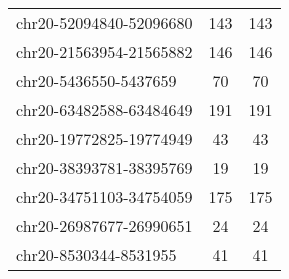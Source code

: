 \begin{longtable}{lSS}
	chr20-52094840-52096680 & 143    & 143                                       \\
	chr20-21563954-21565882 & 146    & 146                                       \\
	chr20-5436550-5437659   & 70     & 70                                        \\
	chr20-63482588-63484649 & 191    & 191                                       \\
	chr20-19772825-19774949 & 43     & 43                                        \\
	chr20-38393781-38395769 & 19     & 19                                        \\
	chr20-34751103-34754059 & 175    & 175                                       \\
	chr20-26987677-26990651 & 24     & 24                                        \\
	chr20-8530344-8531955   & 41     & 41                                        \\
\end{longtable}
